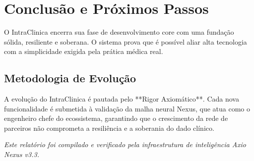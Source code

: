 \chapter{Conclusão e Próximos Passos}

O IntraClinica encerra sua fase de desenvolvimento core com uma fundação sólida, resiliente e soberana. O sistema prova que é possível aliar alta tecnologia com a simplicidade exigida pela prática médica real.

\section{Metodologia de Evolução}

A evolução do IntraClinica é pautada pelo **Rigor Axiomático**. Cada nova funcionalidade é submetida à validação da malha neural Nexus, que atua como o engenheiro chefe do ecossistema, garantindo que o crescimento da rede de parceiros não comprometa a resiliência e a soberania do dado clínico.

\vfill
\centering
\textit{Este relatório foi compilado e verificado pela infraestrutura de inteligência Axio Nexus v3.3.} 🧪🧬🏥
